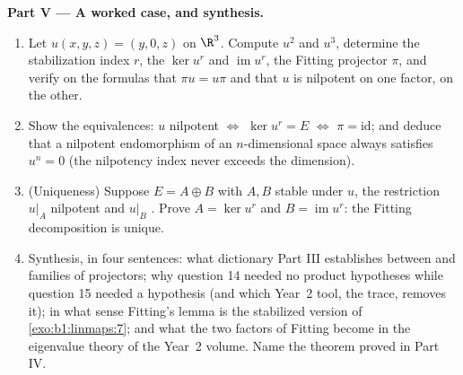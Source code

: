 \begin{problem}
\medskip
\noindent\textbf{Part V --- A worked case, and synthesis.}
\begin{enumerate}[resume]
  \item Let $u(x, y, z) = (y, 0, z)$ on $\R^3$. Compute $u^2$ and
        $u^3$, determine the stabilization index $r$, the
         $\ker u^{r}$ and $\operatorname{im} u^{r}$, the
        Fitting projector $\pi$, and verify on the formulas that
        $\pi u = u\pi$ and that $u$ is nilpotent on one factor,
         on the other.
  \item Show the equivalences: $u$ nilpotent $\iff$ $\ker u^{r} =
        E$ $\iff$ $\pi = \mathrm{id}$; and deduce that a
        nilpotent endomorphism of an $n$-dimensional space
        always satisfies $u^{n} = 0$ (the nilpotency index never
        exceeds the dimension).
  \item (Uniqueness) Suppose $E = A \oplus B$ with $A, B$ stable
        under $u$, the restriction $u|_A$ nilpotent and $u|_B$
        . Prove $A = \ker u^{r}$ and $B =
        \operatorname{im} u^{r}$: the Fitting decomposition is
        unique.
  \item Synthesis, in four sentences: what dictionary Part III
        establishes between  and families of
        projectors; why question 14 needed no product
        hypotheses while question 15 needed a  hypothesis
        (and which Year~2 tool, the trace, removes it); in what
        sense Fitting's lemma is the stabilized version of
        \cref{exo:b1:linmaps:7}; and what the two factors of
        Fitting become in the eigenvalue theory of the Year~2
        volume. Name the theorem proved in Part IV.
\end{enumerate}
\end{problem}
